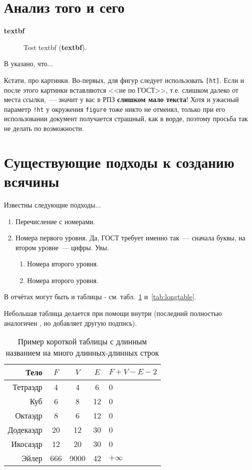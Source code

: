 \documentclass[utf8]{G7-32} %
\begin{document}
\section{Анализ того и сего}

\textbf{textbf}

\begin{figure}
\centering
\caption{Test textbf (\textbf{textbf}).}
\label{fig:dia}
\end{figure}


В \cite{Pup99} указано, что...

Кстати, про картинки. Во-первых, для фигур следует использовать \texttt{[ht]}. Если и после этого картинки вставляются <<не по ГОСТ>>, т.е. слишком далеко от места ссылки,~--- значит у вас в РПЗ \textbf{слишком мало текста}! Хотя и ужасный параметр \texttt{!ht} у окружения \texttt{figure} тоже никто не отменял, только при его использовании документ получается страшный, как в ворде, поэтому просьба так не делать по возможности.


\section{Существующие подходы к созданию всячины}

Известны следующие подходы...

\begin{enumerate}
\item Перечисление с номерами.
\item Номера первого уровня. Да, ГОСТ требует именно так~--- сначала буквы, на втором уровне~--- цифры. Увы.
\begin{enumerate} 
\item Номера второго уровня.
\item Номера второго уровня.
\end{enumerate}
\end{enumerate}

В отчётах могут быть и таблицы - см. табл.~\ref{tab:tabular} и~\ref{tab:longtable}.

Небольшая таблица делается при помощи  внутри  (последний
полностью аналогичен , но добавляет другую подпись).

\begin{table}[ht]
  \caption{Пример короткой таблицы с длинным названием на много длинных-длинных строк}
  \begin{tabular}{|r|c|c|c|l|}
  \hline
  Тело      & $F$ & $V$  & $E$ & $F+V-E-2$ \\
  \hline                       
  Тетраэдр  & 4   & 4    & 6   & 0         \\ 
  Куб       & 6   & 8    & 12  & 0         \\ 
  Октаэдр   & 8   & 6    & 12  & 0         \\ 
  Додекаэдр & 20  & 12   & 30  & 0         \\ 
  Икосаэдр  & 12  & 20   & 30  & 0         \\ 
  \hline
  Эйлер     & 666 & 9000 & 42  & $+\infty$ \\
  \hline
  \end{tabular}      
  \label{tab:tabular}
\end{table}
\end{document}
